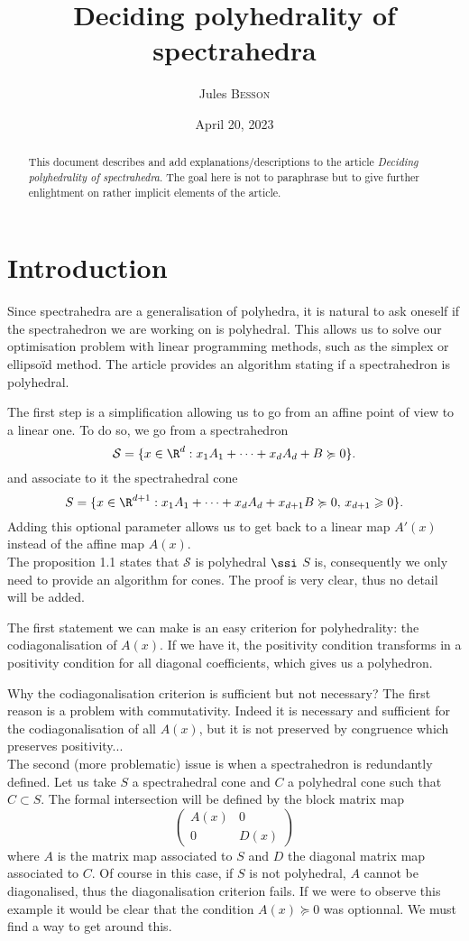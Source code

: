 \documentclass[english, mathematiques, theoremes, diagrammes, dessin, a4paper, margin = 2cm]{article-perso}
\title{Deciding polyhedrality of spectrahedra}
\author{Jules \textsc{Besson}}
\date{April 20, 2023}
\begin{document}
\nocite{*}
\maketitle

\begin{abstract}
	This document describes and add explanations/descriptions to the article \emph{Deciding polyhedrality of spectrahedra}\cite{POL}. The goal here is not to paraphrase but to give further enlightment on rather implicit elements of the article.
\end{abstract}
\section{Introduction}

Since spectrahedra are a generalisation of polyhedra, it is natural to ask oneself if the spectrahedron we are working on is polyhedral. This allows us to solve our optimisation problem with linear programming methods, such as the simplex or ellipsoïd method. The article provides an algorithm stating if a spectrahedron is polyhedral.

The first step is a simplification allowing us to go from an affine point of view to a linear one. To do so, we go from a spectrahedron
\[\mathcal{S} = \{x \in \R^{d}: x_1 A_1 + \cdots + x_d A_d + B \succcurlyeq 0 \}.\]
and associate to it the spectrahedral cone
\[S = \{x \in \R^{d+1}: x_1 A_1 + \cdots + x_d A_d + x_{d+1} B \succcurlyeq 0, \, x_{d+1} \geqslant 0 \}.\]
Adding this optional parameter allows us to get back to a linear map $A'(x)$ instead of the affine map $A(x)$.\\
The proposition 1.1 states that $\mathcal{S}$ is polyhedral $\ssi$ $S$ is, consequently we only need to provide an algorithm for cones. The proof is very clear, thus no detail will be added.

The first statement we can make is an easy criterion for polyhedrality: the codiagonalisation of $A(x)$. If we have it, the positivity condition transforms in a positivity condition for all diagonal coefficients, which gives us a polyhedron.

Why the codiagonalisation criterion is sufficient but not necessary? The first reason is a problem with commutativity. Indeed it is necessary and sufficient for the codiagonalisation of all $A(x)$, but it is not preserved by congruence which preserves positivity...\\
The second (more problematic) issue is when a spectrahedron is redundantly defined. Let us take $S$ a spectrahedral cone and $C$ a polyhedral cone such that $C \subset S$. The formal intersection will be defined by the block matrix map
\[\left(\begin{matrix}
	A(x)	&	0	\\
	0	&	D(x)
\end{matrix}\right)\]
where $A$ is the matrix map associated to $S$ and $D$ the diagonal matrix map associated to $C$. Of course in this case, if $S$ is not polyhedral, $A$ cannot be diagonalised, thus the diagonalisation criterion fails. If we were to observe this example it would be clear that the condition $A(x) \succcurlyeq 0$ was optionnal. We must find a way to get around this.
\end{document}
